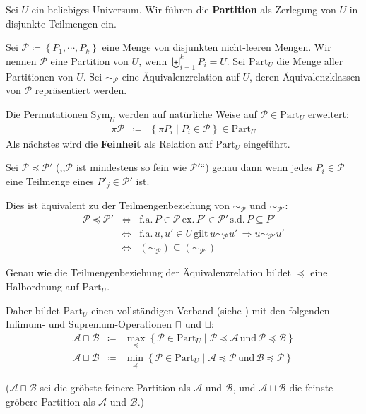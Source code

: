 Sei $U$ ein beliebiges Universum. Wir führen die \textbf{Partition
}als Zerlegung von $U$ in disjunkte Teilmengen ein.
\begin{defn}
Sei $\mathcal{P}\coloneqq\left\{ P_{1},\cdots,P_{k}\right\} $ eine
Menge von disjunkten nicht-leeren Mengen. Wir nennen $\mathcal{P}$
eine Partition von $U$, wenn $\biguplus_{i=1}^{k}P_{i}=U$. Sei $\mathrm{Part}_{U}$
die Menge aller Partitionen von $U$. Sei $\sim_{\mathcal{P}}$ eine
Äquivalenzrelation auf $U$, deren Äquivalenzklassen von $\mathcal{P}$
repräsentiert werden.
\end{defn}
Die Permutationen $\mathrm{Sym}_{U}$ werden auf natürliche Weise
auf $\mathcal{P}\in\mathrm{Part}_{U}$ erweitert:
\begin{eqnarray*}
\pi\mathcal{P} & \coloneqq & \left\{ \pi P_{i}\mid P_{i}\in\mathcal{P}\right\} \in\mathrm{Part}_{U}
\end{eqnarray*}
Als nächstes wird die \textbf{Feinheit} als Relation auf $\mathrm{Part}_{U}$
eingeführt.
\begin{defn}
\label{def:feinheit}Sei $\mathcal{P}\preceq\mathcal{P}'$ (,,$\mathcal{P}$
ist mindestens so fein wie $\mathcal{P}'$``) genau dann wenn jedes
$P_{i}\in\mathcal{P}$ eine Teilmenge eines $P'_{j}\in\mathcal{P}'$
ist.

Dies ist äquivalent zu der Teilmengenbeziehung von $\sim_{\mathcal{P}}$
und $\sim_{\mathcal{P}'}$: 
\begin{eqnarray*}
\mathcal{P}\preceq\mathcal{P}' & \Leftrightarrow & \mathrm{f.a.}\,P\in\mathcal{P}\,\mathrm{ex.\,}P'\in\mathcal{P}'\,\mathrm{s.d.}\,P\subseteq P'\\
 & \Leftrightarrow & \mathrm{f.a.}\,u,u'\in U\,\mathrm{gilt}\,u\sim_{\mathcal{P}}u'\,\Rightarrow u\sim_{\mathcal{P}'}u'\\
 & \Leftrightarrow & \left(\sim_{\mathcal{P}}\right)\subseteq\left(\sim_{\mathcal{P}'}\right)
\end{eqnarray*}

Genau wie die Teilmengenbeziehung der Äquivalenzrelation bildet $\preceq$
eine Halbordnung auf $\mathrm{Part}_{U}$.

Daher bildet $\mathrm{Part}_{U}$ einen vollständigen Verband (siehe
\cite{Klein-Barmen1935}) mit den folgenden Infimum- und Supremum-Operationen
$\sqcap$ und $\sqcup$:
\begin{eqnarray*}
\mathcal{A}\sqcap\mathcal{B} & \coloneqq & \max_{\preceq}\left\{ \mathcal{P}\in\mathrm{Part}_{U}\mid\mathcal{P}\preceq\mathcal{A}\,\mathrm{und}\,\mathcal{P}\preceq\mathcal{B}\right\} \\
\mathcal{A}\sqcup\mathcal{B} & \coloneqq & \min_{\preceq}\left\{ \mathcal{P}\in\mathrm{Part}_{U}\mid\mathcal{A}\preceq\mathcal{P}\,\mathrm{und}\,\mathcal{B}\preceq\mathcal{P}\right\} 
\end{eqnarray*}

($\mathcal{A}\sqcap\mathcal{B}$ sei die gröbste feinere Partition
als $\mathcal{A}$ und $\mathcal{B}$, und $\mathcal{A}\sqcup\mathcal{B}$
die feinste gröbere Partition als $\mathcal{A}$ und $\mathcal{B}$.)
\end{defn}
